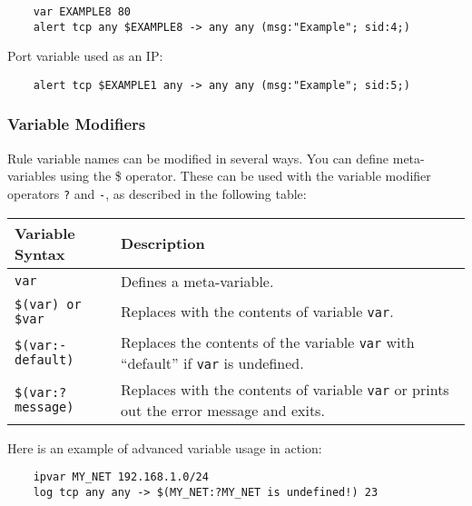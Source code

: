 \documentclass[english]{report}
\begin{document}
\begin{verbatim}     
    var EXAMPLE8 80 
    alert tcp any $EXAMPLE8 -> any any (msg:"Example"; sid:4;)
\end{verbatim}

Port variable used as an IP:

\begin{verbatim}     
    alert tcp $EXAMPLE1 any -> any any (msg:"Example"; sid:5;)
\end{verbatim}

\subsubsection{Variable Modifiers}

Rule variable names can be modified in several ways. You can define
meta-variables using the \$ operator. These can be used with the variable
modifier operators {\tt ?}  and {\tt -}, as described in the following table: 

\begin{center}
\begin{tabular}{| l | p{4.5in} |}

\hline
\textbf{Variable Syntax} & \textbf{Description}\\
\hline

\hline
\texttt{var} &

Defines a meta-variable.\\

\hline
\texttt{\$(var) or \$var} &

Replaces with the contents of variable \texttt{var}.\\

\hline
\texttt{\$(var:-default)} &

Replaces the contents of the variable \texttt{var} with ``default'' if
\texttt{var} is undefined.\\

\hline
\texttt{\$(var:?message)} &

Replaces with the contents of variable \texttt{var} or prints out the error
message and exits.\\

\hline
\end{tabular}
\end{center}

Here is an example of advanced variable usage in action:

\begin{verbatim}
    ipvar MY_NET 192.168.1.0/24
    log tcp any any -> $(MY_NET:?MY_NET is undefined!) 23
\end{verbatim}
\end{document}
